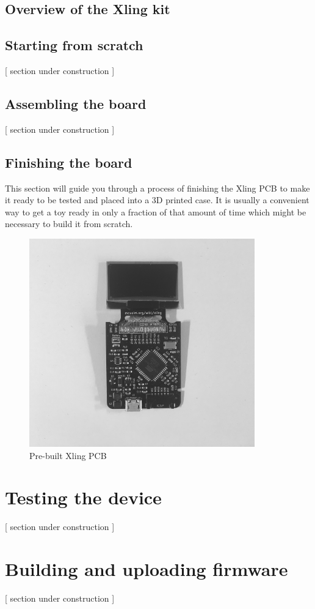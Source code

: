 \documentclass[11pt,a4paper,twoside]{report}
\begin{document}
\section{Overview of the Xling kit}
\label{sec:overview_of_the_kit}

\section{Starting from scratch}
\label{sec:board_from_scratch}
[ section under construction ]

\section{Assembling the board}
\label{sec:board_from_kit}
[ section under construction ]

\section{Finishing the board}
\label{sec:board_from_prebuilt_kit}
This section will guide you through a process of finishing the Xling PCB
to make it ready to be tested and placed into a 3D printed case. It is usually
a convenient way to get a toy ready in only a fraction of that amount of time
which might be necessary to build it from scratch.
\begin{figure}[h]
	\centering
	\includegraphics[height=9cm]{prebuilt_pcb_grayscale}
	\caption{Pre-built Xling PCB}
\end{figure}

\chapter{Testing the device}
\label{chap:testing_device}
[ section under construction ]

\chapter{Building and uploading firmware}
\label{chap:building_firmware}
[ section under construction ]
\end{document}
